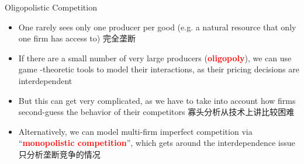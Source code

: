 \documentclass[10pt,hyperref={CJKbookmarks=true},xcolor=dvipsnames,aspectratio=169]{beamer}
\begin{document}
\begin{frame}{Oligopolistic Competition }

\begin{itemize}
\item One rarely sees only one producer per good (e.g. a natural resource
that only one firm has access to) 完全垄断
\item If there are a small number of very large producers (\textbf{\textcolor{red}{oligopoly}}),
we can use game -theoretic tools to model their interactions, as their
pricing decisions are interdependent 
\item But this can get very complicated, as we have to take into account
how firms second-guess the behavior of their competitors 寡头分析从技术上讲比较困难
\item Alternatively, we can model multi-firm imperfect competition via “\textbf{\textcolor{red}{monopolistic
competition}}”, which gets around the interdependence issue 只分析垄断竞争的情况
\end{itemize}
\end{frame}
\end{document}
